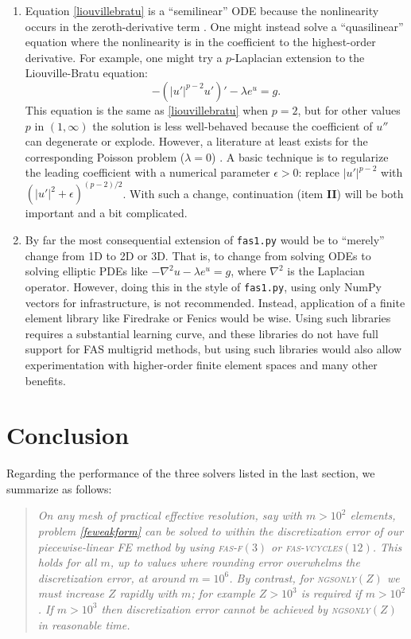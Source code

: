 \documentclass[letterpaper,final,12pt,reqno]{amsart}
\newcommand{\eps}{\epsilon}
\newcommand{\grad}{\nabla}
\begin{document}
\begin{enumerate}
\item Equation \eqref{liouvillebratu} is a ``semilinear'' ODE because the nonlinearity occurs in the zeroth-derivative term \cite{Evans2010}.  One might instead solve a ``quasilinear'' equation where the nonlinearity is in the coefficient to the highest-order derivative.  For example, one might try a $p$-Laplacian \cite{Evans2010} extension to the Liouville-Bratu equation:
\begin{equation}
  -\left(|u'|^{p-2} u'\right)' - \lambda e^u = g.  \label{pbratu}
\end{equation}
This equation is the same as \eqref{liouvillebratu} when $p=2$, but for other values $p$ in $(1,\infty)$ the solution is less well-behaved because the coefficient of $u''$ can degenerate or explode.  However, a literature at least exists for the corresponding Poisson problem ($\lambda=0$) \cite{BarrettLiu1993,Bueler2021,Evans2007}.  A basic technique is to regularize the leading coefficient with a numerical parameter $\eps>0$: replace $|u'|^{p-2}$ with $\left(|u'|^2+\eps\right)^{(p-2)/2}$.  With such a change, continuation (item \textbf{II}) will be both important and a bit complicated.
\item By far the most consequential extension of \texttt{fas1.py} would be to ``merely'' change from 1D to 2D or 3D.  That is, to change from solving ODEs to solving elliptic PDEs like $-\grad^2 u - \lambda e^u=g$, where $\grad^2$ is the Laplacian operator.  However, doing this in the style of \texttt{fas1.py}, using only NumPy vectors for infrastructure, is not recommended.  Instead, application of a finite element library like Firedrake \cite{Bueler2021,Rathgeberetal2016} or Fenics \cite{Loggetal2012} would be wise.  Using such libraries requires a substantial learning curve, and these libraries do not have full support for FAS multigrid methods, but using such libraries would also allow experimentation with higher-order finite element spaces and many other benefits.
\end{enumerate}


\section{Conclusion}  \label{sec:conclusion}

Regarding the performance of the three solvers listed in the last section, we summarize as follows:

\begin{quotation}
\emph{On any mesh of practical effective resolution, say with $m>10^2$ elements, problem \eqref{feweakform} can be solved to within the discretization error of our piecewise-linear FE method by using \textsc{fas-f}$(3)$ or \textsc{fas-vcycles}$(12)$.  This holds for all $m$, up to values where rounding error overwhelms the discretization error, at around $m=10^6$.  By contrast, for \textsc{ngsonly}$(Z)$ we must increase $Z$ rapidly with $m$; for example $Z > 10^3$ is required if $m>10^2$.  If $m>10^3$ then discretization error cannot be achieved by \textsc{ngsonly}$(Z)$ in reasonable time.}
\end{quotation}
\end{document}
